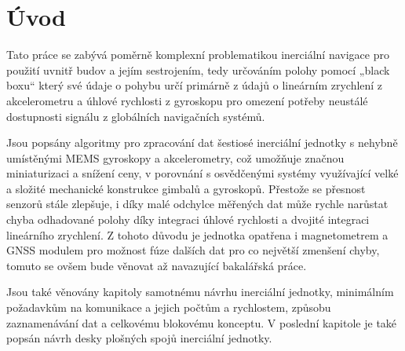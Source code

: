 \chapter*{Úvod}
{}

Tato práce se zabývá poměrně komplexní problematikou inerciální navigace pro použití uvnitř budov a jejím sestrojením, tedy určováním polohy pomocí „black boxu“ který své údaje o pohybu určí primárně z údajů o lineárním zrychlení z akcelerometru a úhlové rychlosti z gyroskopu pro omezení potřeby neustálé dostupnosti signálu z globálních navigačních systémů.

Jsou popsány algoritmy pro zpracování dat šestiosé inerciální jednotky s nehybně umístěnými \ac{MEMS} gyroskopy a akcelerometry, což umožňuje značnou miniaturizaci a snížení ceny, v porovnání s osvědčenými systémy využívající velké a složité mechanické konstrukce gimbalů a gyroskopů. Přestože se přesnost senzorů stále zlepšuje, i díky malé odchylce měřených dat může rychle narůstat chyba odhadované polohy díky integraci úhlové rychlosti a dvojité integraci lineárního zrychlení. Z tohoto důvodu je jednotka opatřena i magnetometrem a \ac{GNSS} modulem pro možnost fúze dalších dat pro co největší zmenšení chyby, tomuto se ovšem bude věnovat až navazující bakalářská práce.

Jsou také věnovány kapitoly samotnému návrhu inerciální jednotky, minimálním požadavkům na komunikace a jejich počtům a rychlostem, způsobu zaznamenávání dat a celkovému blokovému konceptu. V poslední kapitole je také popsán návrh desky plošných spojů inerciální jednotky. 